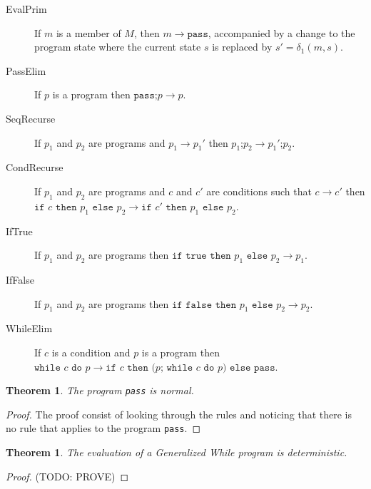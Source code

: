 \documentclass[11pt]{article}
\begin{document}
\begin{description}

\item[EvalPrim] If $m$ is a member of $M$, then $m \rightarrow \texttt{pass}$, accompanied by a change to the program state where the current state $s$ is replaced by $s' = \delta_{1}(m, s)$.
\item[PassElim] If $p$ is a program then $\texttt{pass;}p \rightarrow p$.
\item[SeqRecurse] If $p_{1}$ and $p_{2}$ are programs and $p_{1} \rightarrow p_{1}'$ then $p_{1}\texttt{;}p_{2} \rightarrow p_{1}'\texttt{;}p_{2}$.

\item[CondRecurse] If $p_{1}$ and $p_{2}$ are programs and $c$ and $c'$ are conditions such that $c \rightarrow c'$ then $\texttt{if } c \texttt{ then } p_{1} \texttt{ else } p_{2} \rightarrow \texttt{if } c' \texttt{ then } p_{1} \texttt{ else } p_{2}$.

\item[IfTrue] If $p_{1}$ and $p_{2}$ are programs then $\texttt{if true then } p_{1} \texttt{ else } p_{2} \rightarrow p_{1}$.

\item[IfFalse] If $p_{1}$ and $p_{2}$ are programs then $\texttt{if false then } p_{1} \texttt{ else } p_{2} \rightarrow p_{2}$.

\item[WhileElim] If $c$ is a condition and $p$ is a program then \\ $\texttt{while } c \texttt{ do } p \rightarrow \texttt{if } c \texttt{ then (} p \texttt{; while } c \texttt{ do } p \texttt{) else pass}$.
\end{description}

\newtheorem*{passisnormal}{Theorem}
\begin{passisnormal}
The program \texttt{pass} is normal.
\end{passisnormal}

\begin{proof}
The proof consist of looking through the rules and noticing that there is no rule that applies to the program \texttt{pass}.
\end{proof}

\newtheorem*{determinism}{Theorem}
\begin{determinism}
The evaluation of a Generalized While program is deterministic.
\end{determinism}

\begin{proof}
(TODO: PROVE)
\end{proof}
\end{document}
